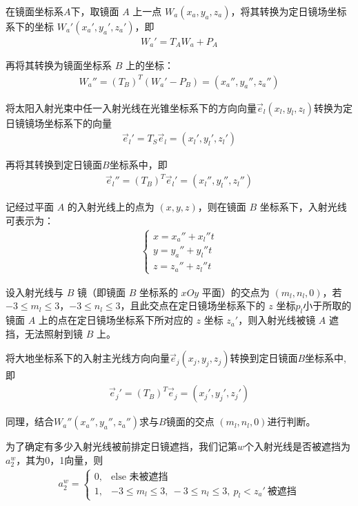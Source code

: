 \documentclass[../main.tex]{subfiles}
\begin{document}
\par 在镜面坐标系$A$下，取镜面 \( A \) 上一点 \( W_a (x_a,y_a,z_a) \)，将其转换为定日镜场坐标系下的坐标 \( W_a' (x_a', y_a', z_a') \)，即
\begin{align}\label{1.30}
   W_a' = T_A W_a + P_A
\end{align}
\par 再将其转换为镜面坐标系 \( B \) 上的坐标：
\begin{align}\label{1.31}
 W_a'' = (T_B)^T (W_a' - P_B)=(x_a'', y_a'', z_a'')
\end{align}
\par 将太阳入射光束中任一入射光线在光锥坐标系下的方向向量$\vec{e}_l(x_l, y_l, z_l)$转换为定日镜镜场坐标系下的向量
\begin{align}    \label{1.32}
\vec{e}_l'=T_S\vec{e}_l=\left( x_l',y_l',z_l' \right) 
\end{align}
\par 再将其转换到定日镜面$B$坐标系中，即
\begin{align} \label{1.33}
  \vec{e}_l'' = (T_B)^T \vec{e}_l' = (x_l'', y_l'', z_l'')
\end{align}
 \par 记经过平面 $A$ 的入射光线上的点为 $(x, y, z)$，则在镜面 $B$ 坐标系下，入射光线可表示为：
\begin{align} \label{1.34}
 \begin{cases}
x = x_a'' + x_l'' t \\
y = y_a'' + y_l'' t \\
z = z_a'' + z_l'' t
\end{cases}
\end{align}
\par 设入射光线与 $B$ 镜（即镜面 $B$ 坐标系的 $xOy$ 平面）的交点为 $(m_l, n_l, 0)$，若 $-3 \leq m_l \leq 3$，$-3 \leq n_l \leq 3$，且此交点在定日镜场坐标系下的 $z$ 坐标$p_l$小于所取的镜面 $A$ 上的点在定日镜场坐标系下所对应的 $z$ 坐标 $z_a'$，则入射光线被镜 \( A \) 遮挡，无法照射到镜 \( B \) 上。
\par 将大地坐标系下的入射主光线方向向量$\vec{e}_j (x_j, y_j, z_j)$转换到定日镜面$B$坐标系中,即
\begin{align}    \label{1.32}
\vec{e}_j'=(T_B)^T\vec{e}_j=\left( x_j',y_j',z_j' \right) 
\end{align}
\par 同理，结合$ W_a''(x_a'', y_a'', z_a'')$求与$B$镜面的交点 $(m_l, n_l, 0)$进行判断。
\par 为了确定有多少入射光线被前排定日镜遮挡，我们记第$w$个入射光线是否被遮挡为$a_2^w$，其为0，1向量，则
\begin{align}    \label{1.33}
a_2^w = 
\begin{cases} 
0, & \text{else 未被遮挡} \\
1, & -3 \leq m_l \leq 3,\ -3 \leq n_l \leq 3,\ p_l < z_a'\ \text{被遮挡} 
\end{cases}
 \end{align}
\end{document}
